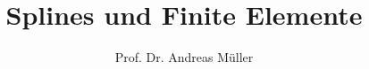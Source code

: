 %
%
%


\beamertemplatenavigationsymbolsempty
\title[FEM und Splines]{Splines und Finite Elemente}
\author[A.~Müller]{Prof. Dr. Andreas Müller}
\date[]{}


